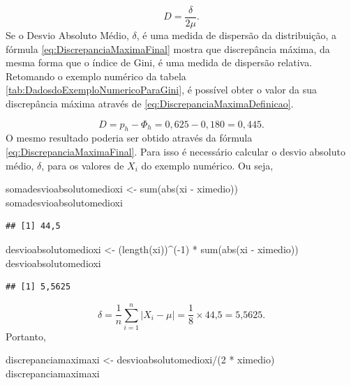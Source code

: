 \documentclass[
]{book}
\newenvironment{Shaded}{\begin{snugshade}}{\end{snugshade}}
\newcommand{\DecValTok}[1]{\textcolor[rgb]{0.00,0.00,0.81}{#1}}
\newcommand{\FunctionTok}[1]{\textcolor[rgb]{0.00,0.00,0.00}{#1}}
\newcommand{\NormalTok}[1]{#1}
\newcommand{\OtherTok}[1]{\textcolor[rgb]{0.56,0.35,0.01}{#1}}
\newcommand{\SpecialCharTok}[1]{\textcolor[rgb]{0.00,0.00,0.00}{#1}}
\begin{document}
\[
D = \dfrac{\delta}{2\mu}.
\label{eq:DiscrepanciaMaximaFinal}
\]
Se o Desvio Absoluto Médio, \(\delta\), é uma medida de dispersão da distribuição, a fórmula \eqref{eq:DiscrepanciaMaximaFinal} mostra que discrepância máxima, da mesma forma que o índice de Gini, é uma medida de dispersão relativa.
Retomando o exemplo numérico da tabela \ref{tab:DadosdoExemploNumericoParaGini}, é possível obter o valor da sua discrepância máxima através de \eqref{eq:DiscrepanciaMaximaDefinicao}.

\[
D = p_h - \Phi_h = 0,625 - 0,180 = 0,445.
\]
O mesmo resultado poderia ser obtido através da fórmula \eqref{eq:DiscrepanciaMaximaFinal}. Para isso é necessário calcular o desvio absoluto médio, \(\delta\), para os valores de \(X_i\) do exemplo numérico. Ou seja,

\begin{Shaded}
\begin{Highlighting}[]
\NormalTok{somadesvioabsolutomedioxi }\OtherTok{\textless{}{-}} \FunctionTok{sum}\NormalTok{(}\FunctionTok{abs}\NormalTok{(xi }\SpecialCharTok{{-}}\NormalTok{ ximedio))}
\NormalTok{somadesvioabsolutomedioxi}
\end{Highlighting}
\end{Shaded}

\begin{verbatim}
## [1] 44,5
\end{verbatim}

\begin{Shaded}
\begin{Highlighting}[]
\NormalTok{desvioabsolutomedioxi }\OtherTok{\textless{}{-}}\NormalTok{ (}\FunctionTok{length}\NormalTok{(xi))}\SpecialCharTok{\^{}}\NormalTok{(}\SpecialCharTok{{-}}\DecValTok{1}\NormalTok{) }\SpecialCharTok{*} \FunctionTok{sum}\NormalTok{(}\FunctionTok{abs}\NormalTok{(xi }\SpecialCharTok{{-}} 
\NormalTok{    ximedio))}
\NormalTok{desvioabsolutomedioxi}
\end{Highlighting}
\end{Shaded}

\begin{verbatim}
## [1] 5,5625
\end{verbatim}

\[
\delta = \dfrac{1}{n}\sum_{i=1}^{n}|X_i - \mu| = \dfrac{1}{\text{8}}\times \text{44,5} = \text{5,5625}.
\]
Portanto,

\begin{Shaded}
\begin{Highlighting}[]
\NormalTok{discrepanciamaximaxi }\OtherTok{\textless{}{-}}\NormalTok{ desvioabsolutomedioxi}\SpecialCharTok{/}\NormalTok{(}\DecValTok{2} \SpecialCharTok{*} 
\NormalTok{    ximedio)}
\NormalTok{discrepanciamaximaxi}
\end{Highlighting}
\end{Shaded}
\end{document}
